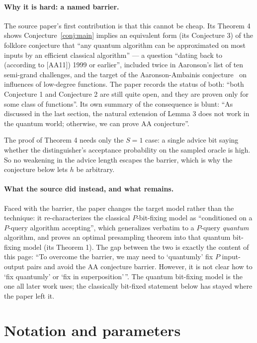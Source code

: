 \documentclass{conjura-conjecture}
\begin{document}
\paragraph{Why it is hard: a named barrier.}
The source paper's first contribution is that this cannot be cheap. Its
Theorem 4 shows Conjecture~\ref{conj:main} implies an equivalent form
(its Conjecture 3) of the folklore conjecture that ``any quantum
algorithm can be approximated on most inputs by an efficient classical
algorithm'' --- a question ``dating back to (according to
[AA11]) 1999 or earlier'', included twice in Aaronson's list of ten
semi-grand challenges, and the target of the Aaronson-Ambainis
conjecture~\cite{AA11} on influences of low-degree functions. The paper
records the status of both: ``both Conjecture 1 and Conjecture 2 are
still quite open, and they are proven only for some class of
functions''. Its own summary of the consequence is blunt: ``As
discussed in the last section, the natural extension of Lemma 3 does not
work in the quantum world; otherwise, we can prove AA conjecture''.

The proof of Theorem 4 needs only the $S = 1$ case: a single advice bit
saying whether the distinguisher's acceptance probability on the sampled
oracle is high. So no weakening in the advice length escapes the
barrier, which is why the conjecture below lets $h$ be arbitrary.

\paragraph{What the source did instead, and what remains.}
Faced with the barrier, the paper changes the target model rather than
the technique: it re-characterizes the classical $P$-bit-fixing model as
``conditioned on a $P$-query algorithm accepting'', which generalizes
verbatim to a $P$-query \emph{quantum} algorithm, and proves an optimal
presampling theorem into that quantum bit-fixing model (its Theorem 1).
The gap between the two is exactly the content of this page: ``To
overcome the barrier, we may need to `quantumly' fix $P$ input-output
pairs and avoid the AA conjecture barrier. However, it is not clear how
to `fix quantumly' or `fix in superposition'\,''. The quantum bit-fixing
model is the one all later work uses; the classically bit-fixed
statement below has stayed where the paper left it.

\section{Notation and parameters}\label{sec:notation}
\end{document}

